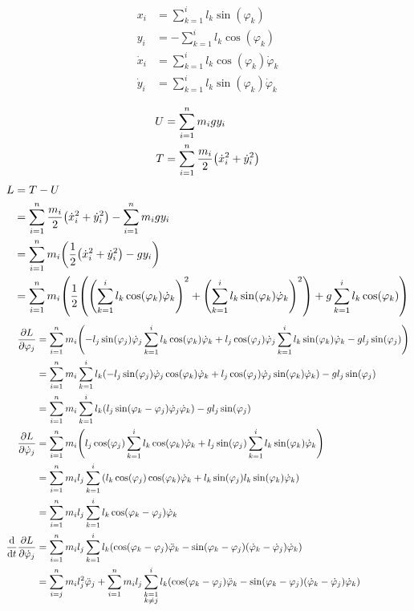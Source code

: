 \documentclass{article}
\renewcommand{\phi}{\varphi}
\begin{document}
\begin{align*}
  x_i &= \sum_{k=1}^i l_k \sin(\phi_k) \\
  y_i &= - \sum_{k=1}^i l_k \cos(\phi_k) \\
  \dot x_i &= \sum_{k=1}^i l_k \cos(\phi_k) \dot\phi_k \\
  \dot y_i &= \sum_{k=1}^i l_k \sin(\phi_k) \dot\phi_k \\
\end{align*}
\begin{align*}
  U &= \sum_{i=1}^n m_i g y_i \\
  T &= \sum_{i=1}^n \frac{m_i}{2} \pqty{\dot x_i^2 + \dot y_i^2} \\
\end{align*}
\begin{align*}
  L &= T - U \\
    &= \sum_{i=1}^n \frac{m_i}{2} \pqty{\dot x_i^2 + \dot y_i^2} - \sum_{i=1}^n m_i g y_i \\
    &= \sum_{i=1}^n m_i \pqty{\frac{1}{2} \pqty{\dot x_i^2 + \dot y_i^2} - g y_i} \\
    &= \sum_{i=1}^n m_i \pqty{\frac{1}{2} \pqty{{\pqty{\sum_{k=1}^i l_k \cos(\phi_k) \dot\phi_k}}^2 + {\pqty{\sum_{k=1}^i l_k \sin(\phi_k) \dot\phi_k}}^2} + g \sum_{k=1}^i l_k \cos(\phi_k)} \\
\end{align*}
\begin{align*}
  \pdv{L}{\phi_j} &= \sum_{i=1}^n m_i \pqty{-l_j \sin(\phi_j) \dot\phi_j \sum_{k=1}^i l_k \cos(\phi_k) \dot\phi_k + l_j \cos(\phi_j) \dot\phi_j \sum_{k=1}^i l_k \sin(\phi_k) \dot\phi_k - g l_j \sin(\phi_j)} \\
                  &= \sum_{i=1}^n m_i \sum_{k=1}^i l_k \pqty{-l_j \sin(\phi_j) \dot\phi_j \cos(\phi_k) \dot\phi_k + l_j \cos(\phi_j) \dot\phi_j \sin(\phi_k) \dot\phi_k} - g l_j \sin(\phi_j) \\
                  &= \sum_{i=1}^n m_i \sum_{k=1}^i l_k \pqty{l_j \sin(\phi_k - \phi_j) \dot\phi_j \dot\phi_k} - g l_j \sin(\phi_j) \\
  \pdv{L}{\dot\phi_j} &= \sum_{i=1}^n m_i \pqty{l_j \cos(\phi_j) \sum_{k=1}^i l_k \cos(\phi_k) \dot\phi_k + l_j \sin(\phi_j) \sum_{k=1}^i l_k \sin(\phi_k) \dot\phi_k} \\
                      &= \sum_{i=1}^n m_i l_j \sum_{k=1}^i \pqty{l_k \cos(\phi_j) \cos(\phi_k) \dot\phi_k + l_k \sin(\phi_j) l_k \sin(\phi_k) \dot\phi_k} \\
                      &= \sum_{i=1}^n m_i l_j \sum_{k=1}^i l_k \cos(\phi_k - \phi_j) \dot\phi_k \\
  \dv{t} \pdv{L}{\dot\phi_j} &= \sum_{i=1}^n m_i l_j \sum_{k=1}^i l_k \pqty{\cos(\phi_k - \phi_j) \ddot\phi_k - \sin(\phi_k - \phi_j)(\dot\phi_k - \dot\phi_j)\dot\phi_k} \\
                             &= \sum_{i=j}^n m_i l_j^2 \ddot\phi_j + \sum_{i=1}^n m_i l_j \sum_{\substack{k=1\\k \neq j}}^i l_k \pqty{\cos(\phi_k - \phi_j) \ddot\phi_k - \sin(\phi_k - \phi_j)(\dot\phi_k - \dot\phi_j)\dot\phi_k} \\
\end{align*}
\end{document}
